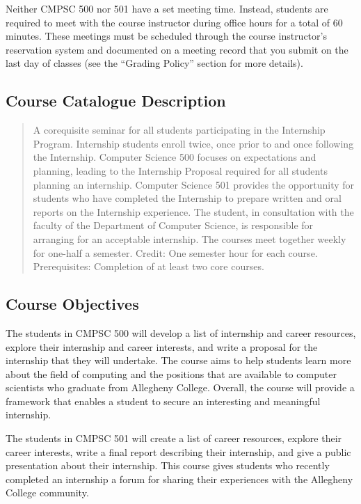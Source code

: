 Neither CMPSC 500 nor 501 have a set meeting time.  Instead, students are required to meet with the course instructor
during office hours for a total of 60 minutes.  These meetings must be scheduled through the course instructor's reservation
system and documented on a meeting record that you submit on the last day of classes (see the ``Grading Policy''
section for more details).

\subsection*{Course Catalogue Description}

\begin{quote}
A corequisite seminar for all students participating in the Internship Program.  Internship students enroll twice, once
prior to and once following the Internship. Computer Science 500 focuses on expectations and planning, leading to the
Internship Proposal required for all students planning an internship.  Computer Science 501 provides the opportunity for
students who have completed the Internship to prepare written and oral reports on the Internship experience. The
student, in consultation with the faculty of the Department of Computer Science, is responsible for arranging for an
acceptable internship.  The courses meet together weekly for one-half a semester. Credit: One semester hour for each
course. Prerequisites: Completion of at least two core courses.
\end{quote}

\subsection*{Course Objectives}

The students in CMPSC 500 will develop a list of internship and career resources, explore their internship and career
interests, and write a proposal for the internship that they will undertake. The course aims to help students
learn more about the field of computing and the positions that are available to computer scientists who graduate from
Allegheny College.  Overall, the course will provide a framework that enables a student to secure an interesting and
meaningful internship.

\noindent
The students in CMPSC 501 will create a list of career resources, explore their career interests, write a final report
describing their internship, and give a public presentation about their internship.  This course gives
students who recently completed an internship a forum for sharing their experiences with the Allegheny College community.

